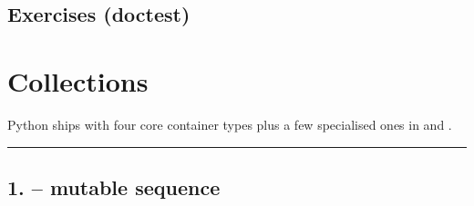\documentclass[a4paper,11pt,english]{sphinxmanual}
\begin{document}
\subsection{Exercises (doctest)}
\label{\detokenize{core_language/classes_oop:exercises-doctest}}
\begin{sphinxVerbatim}[commandchars=\\\{\}]
\end{sphinxVerbatim}

\sphinxstepscope


\section{Collections}
\label{\detokenize{core_language/collections:collections}}\label{\detokenize{core_language/collections::doc}}
\sphinxAtStartPar
Python ships with four core container types plus a few specialised ones in  and .


\bigskip\hrule\bigskip



\subsection{1.  – mutable sequence}
\label{\detokenize{core_language/collections:list-mutable-sequence}}
\begin{sphinxVerbatim}[commandchars=\\\{\}]
  \PYG{p}{[}  \PYG{p}{]}
\PYG{p}{[}\PYG{p}{]}  
\end{sphinxVerbatim}

\sphinxAtStartPar
{}
\end{document}
